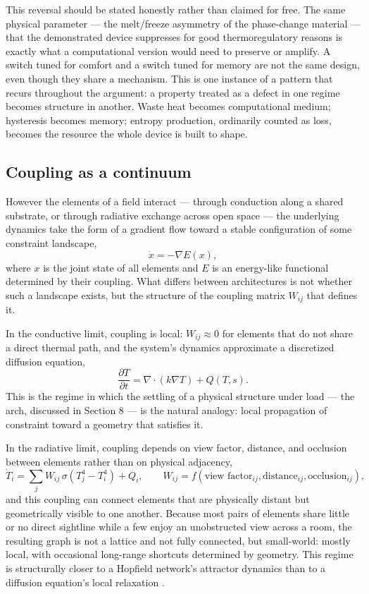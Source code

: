 \documentclass[11pt]{article}
\begin{document}
This reversal should be stated honestly rather than claimed for free. The same physical parameter --- the melt/freeze asymmetry of the phase-change material --- that the demonstrated device suppresses for good thermoregulatory reasons is exactly what a computational version would need to preserve or amplify. A switch tuned for comfort and a switch tuned for memory are not the same design, even though they share a mechanism. This is one instance of a pattern that recurs throughout the argument: a property treated as a defect in one regime becomes structure in another. Waste heat becomes computational medium; hysteresis becomes memory; entropy production, ordinarily counted as loss, becomes the resource the whole device is built to shape.

\subsection{Coupling as a continuum}

However the elements of a field interact --- through conduction along a shared substrate, or through radiative exchange across open space --- the underlying dynamics take the form of a gradient flow toward a stable configuration of some constraint landscape,
\[
\dot{x} = -\nabla E(x),
\]
where $x$ is the joint state of all elements and $E$ is an energy-like functional determined by their coupling. What differs between architectures is not whether such a landscape exists, but the structure of the coupling matrix $W_{ij}$ that defines it.

In the conductive limit, coupling is local: $W_{ij} \approx 0$ for elements that do not share a direct thermal path, and the system's dynamics approximate a discretized diffusion equation,
\[
\frac{\partial T}{\partial t} = \nabla \cdot (k \nabla T) + Q(T, s).
\]
This is the regime in which the settling of a physical structure under load --- the arch, discussed in Section 8 --- is the natural analogy: local propagation of constraint toward a geometry that satisfies it.

In the radiative limit, coupling depends on view factor, distance, and occlusion between elements rather than on physical adjacency,
\[
\dot{T}_i = \sum_j W_{ij}\, \sigma\!\left(T_j^4 - T_i^4\right) + Q_i, \qquad W_{ij} = f(\text{view factor}_{ij}, \text{distance}_{ij}, \text{occlusion}_{ij}),
\]
and this coupling can connect elements that are physically distant but geometrically visible to one another. Because most pairs of elements share little or no direct sightline while a few enjoy an unobstructed view across a room, the resulting graph is not a lattice and not fully connected, but small-world: mostly local, with occasional long-range shortcuts determined by geometry. This regime is structurally closer to a Hopfield network's attractor dynamics than to a diffusion equation's local relaxation \cite{hopfield1982}.
\end{document}
